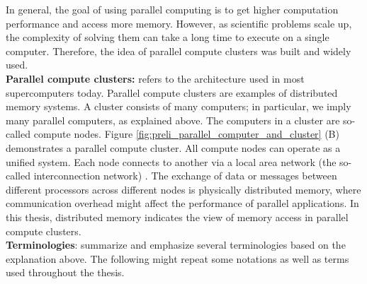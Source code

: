 In general, the goal of using parallel computing is to get higher computation performance and access more memory. However, as scientific problems scale up, the complexity of solving them can take a long time to execute on a single computer. Therefore, the idea of parallel compute clusters was built and widely used.\\

\noindent \textbf{Parallel compute clusters:} refers to the architecture used in most supercomputers today. Parallel compute clusters are examples of distributed memory systems. A cluster consists of many computers; in particular, we imply many parallel computers, as explained above. The computers in a cluster are so-called compute nodes. Figure \ref{fig:preli_parallel_computer_and_cluster} (B) demonstrates a parallel compute cluster. All compute nodes can operate as a unified system. Each node connects to another via a local area network (the so-called interconnection network) \cite{baker1999cluster}. The exchange of data or messages between different processors across different nodes is physically distributed memory, where communication overhead might affect the performance of parallel applications. In this thesis, distributed memory indicates the view of memory access in parallel compute clusters. \\

\noindent \textbf{Terminologies}: summarize and emphasize several terminologies based on the explanation above. The following might repeat some notations as well as terms used throughout the thesis.

